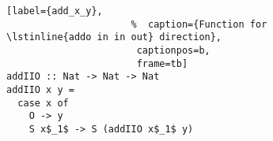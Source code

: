 \begin{figure}[!t]
  \centering
  \begin{minipage}{\columnwidth}
    \begin{lstlisting}[label={add_x_y},
                      %  caption={Function for \lstinline{addo in in out} direction},
                       captionpos=b,
                       frame=tb]
addIIO :: Nat -> Nat -> Nat
addIIO x y =
  case x of
    O -> y
    S x$_1$ -> S (addIIO x$_1$ y)
    \end{lstlisting}
  \end{minipage}
\end{figure}

